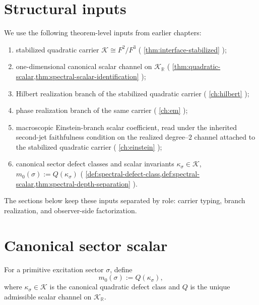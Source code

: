 \section{Structural inputs}
\label{sec:matter-realization-inputs}

We use the following theorem-level inputs from earlier chapters:
\begin{enumerate}[label=\textup{(\roman*)}]
\item
      stabilized quadratic carrier
      \(\mathcal K\cong F^2/F^3\)
      (
      \cref{thm:interface-stabilized}
      );
\item
      one-dimensional canonical scalar channel on
      \(\mathcal K_{\mathbb R}\)
      (
      \cref{thm:quadratic-scalar,thm:spectral-scalar-identification}
      );
\item
      Hilbert realization branch of the stabilized quadratic carrier
      (
      \cref{ch:hilbert}
      );
\item
      phase realization branch of the same carrier
      (
      \cref{ch:em}
      );
\item
      macroscopic Einstein-branch scalar coefficient, read under the
      inherited second-jet faithfulness condition on the realized
      degree--\(2\) channel attached to the stabilized quadratic
      carrier
      (
      \cref{ch:einstein}
      );
\item
      canonical sector defect classes and scalar invariants
      \(\kappa_\sigma\in\mathcal K\),
      \(m_0(\sigma):=Q(\kappa_\sigma)\)
      (
      \cref{def:spectral-defect-class,def:spectral-scalar,thm:spectral-depth-separation}
      ).
\end{enumerate}

The sections below keep these inputs separated by role: carrier typing,
branch realization, and observer-side factorization.

\section{Canonical sector scalar}
\label{sec:matter-realization-scalar}

\begin{definition}
\label{def:canonical-sector-scalar}
For a primitive excitation sector \(\sigma\), define
\[
  m_0(\sigma):=Q(\kappa_\sigma),
\]
where \(\kappa_\sigma\in\mathcal K\) is the canonical quadratic defect
class and \(Q\) is the unique admissible scalar channel on
\(\mathcal K_{\mathbb R}\).
\end{definition}

